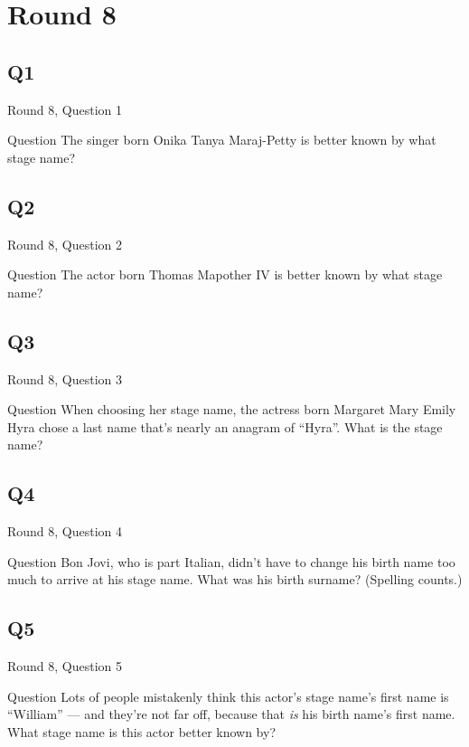 \documentclass[11pt]{beamer}
\begin{document}
\section{Round 8}
\subsection*{Q1}
\begin{frame}[t]{Round 8, Question 1}
\begin{block}{Question}
The singer born Onika Tanya Maraj-Petty is better known by what stage name?
\end{block}
\end{frame}
\subsection*{Q2}
\begin{frame}[t]{Round 8, Question 2}
\begin{block}{Question}
The actor born Thomas Mapother IV is better known by what stage name?
\end{block}
\end{frame}
\subsection*{Q3}
\begin{frame}[t]{Round 8, Question 3}
\begin{block}{Question}
When choosing her stage name, the actress born Margaret Mary Emily Hyra chose a last name that's nearly an anagram of ``Hyra''. What is the stage name?
\end{block}
\end{frame}
\subsection*{Q4}
\begin{frame}[t]{Round 8, Question 4}
\begin{block}{Question}
Bon Jovi, who is part Italian, didn't have to change his birth name too much to arrive at his stage name. What was his birth surname? (Spelling counts.)
\end{block}
\end{frame}
\subsection*{Q5}
\begin{frame}[t]{Round 8, Question 5}
\begin{block}{Question}
Lots of people mistakenly think this actor's stage name's first name is ``William'' --- and they're not far off, because that \emph{is} his birth name's first name. What stage name is this actor better known by?
\end{block}
\end{frame}
\end{document}
